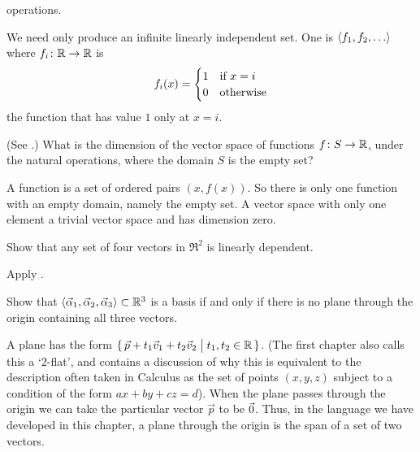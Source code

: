 \begin{exercises}
    operations.
    \begin{answer}
      We need only produce an infinite linearly independent set.
      One is \( \langle f_1,f_2,\ldots\rangle \) where
      \( \mbox{$f_i\colon \mathbb{R}\to \mathbb{R}$} \) is
      \begin{equation*}
         f_i(x)=\begin{cases}
                   1  &\text{if \( x=i \)}  \\
                   0  &\text{otherwise}
                \end{cases}
      \end{equation*}  
      the function that has value $1$ only at $x=i$.
    \end{answer}
  \item  
    (See .)
    What is the dimension of the vector space of functions
    $\mbox{$f\colon S\to \mathbb{R}$}$, under the natural operations, where the
    domain $S$ is the empty set?
    \begin{answer}
      A function is a set of ordered pairs
      $(x,f(x))$.
      So there is only one function with an empty domain, namely the empty set.
      A vector space with only one element a trivial vector space 
      and has dimension zero.
    \end{answer}
  \item  
    Show that 
    any set of four vectors in \( \Re^2 \) is linearly dependent.
    \begin{answer}
      Apply .
    \end{answer}
  \item  
    Show that
    \( \langle\vec{\alpha}_1,\vec{\alpha}_2,\vec{\alpha}_3\rangle\subset\mathbb{R}^3 \)
    is a basis if and only if there is no plane through the origin containing
    all three vectors.
    \begin{answer}
      A plane has the
      form $\mbox{$\{\,\vec{p}+t_1\vec{v}_1+t_2\vec{v}_2\bigm| t_1,t_2\in\mathbb{R}\,\}$}$.
      (The first chapter also calls this a `$2$-flat', and contains
      a discussion of why this is equivalent to the
      description often taken in Calculus as the set of points $(x,y,z)$
      subject to a condition of the form $ax+by+cz=d$).
      When the plane passes through the origin we can take the particular
      vector $\vec{p}$ to be $\vec{0}$.
      Thus, in the language we have developed in this chapter, a plane through
      the origin is the span of a set of two vectors.


\end{answer}
\end{exercises}
